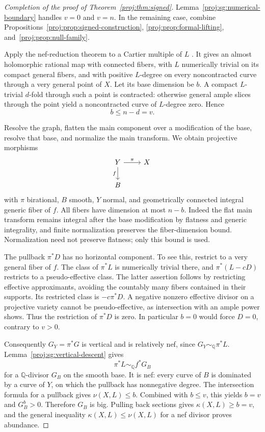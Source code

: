 \documentclass[11pt,letterpaper]{article}
\newcommand{\Q}{\mathbb{Q}}
\theoremstyle{definition}
\theoremstyle{remark}
\begin{document}
\begin{proof}[Completion of the proof of Theorem~\ref{proj:thm:signed}]
Lemma~\ref{proj:sg:numerical-boundary} handles $v=0$ and $v=n$.
In the remaining case, combine
Propositions~\ref{proj:prop:signed-construction},
\ref{proj:prop:formal-lifting}, and~\ref{proj:prop:null-family}.

Apply the nef-reduction theorem to a Cartier multiple
of $L$ \cite[Theorem~2.1]{Proj-BauerEtAl2002}.  It gives an almost
holomorphic rational map with connected fibers, with
$L$ numerically trivial on its compact general fibers,
and with positive $L$-degree on every noncontracted
curve through a very general point of $X$.
Let its base dimension be $b$.  A compact $L$-trivial
$d$-fold through such a point is contracted: otherwise
general ample slices through the point yield a
noncontracted curve of $L$-degree zero.  Hence
\[
 b\le n-d=v.
\]

Resolve the graph, flatten the main component over a
modification of the base, resolve that base, and
normalize the main transform.  We obtain projective
morphisms
\[
 \begin{tikzcd}
 Y \arrow[r,"\pi"] \arrow[d,"f"'] & X\\
 B &
 \end{tikzcd}
\]
with $\pi$ birational, $B$ smooth, $Y$ normal, and
geometrically connected integral generic fiber of $f$.
All fibers have dimension at most $n-b$.
Indeed the flat main transform remains integral after
the base modification by flatness and generic
integrality, and finite normalization preserves the
fiber-dimension bound.  Normalization need not preserve
flatness; only this bound is used.

The pullback $\pi^*D$ has no horizontal component.
To see this, restrict to a very general fiber of $f$.
The class of $\pi^*L$ is numerically trivial there,
and $\pi^*(L-cD)$ restricts to a pseudo-effective class.
The latter assertion follows by restricting effective
approximants, avoiding the countably many fibers
contained in their supports.  Its restricted class is
$-c\pi^*D$.  A negative nonzero effective divisor on a
projective variety cannot be pseudo-effective, as
intersection with an ample power shows.  Thus the
restriction of $\pi^*D$ is zero.  In particular $b=0$
would force $D=0$, contrary to $v>0$.

Consequently $G_Y=\pi^*G$ is vertical and is relatively
nef, since $G_Y\sim_{\Q}\pi^*L$.  Lemma~\ref{proj:sg:vertical-descent}
gives
\[
 \pi^*L\sim_{\Q}f^*G_B
\]
for a $\Q$-divisor $G_B$ on the smooth base.
It is nef: every curve of $B$ is dominated by a curve
of $Y$, on which the pullback has nonnegative degree.
The intersection formula for a pullback gives
$\nu(X,L)\le b$.  Combined with $b\le v$, this yields
$b=v$ and $G_B^b>0$.  Therefore $G_B$ is big.
Pulling back sections gives
$\kappa(X,L)\ge b=v$, and the general inequality
$\kappa(X,L)\le\nu(X,L)$ for a nef divisor proves
abundance.
\end{proof}
\end{document}

